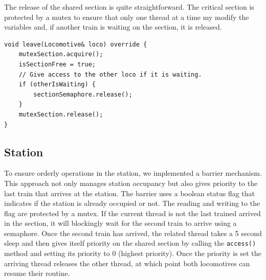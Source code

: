 \documentclass{article}
\begin{document}
    The release of the shared section is quite straightforward. The critical section is protected by a mutex to ensure that only one thread at a time my modify the variables and, if another train is waiting on the section, it is released.

    \begin{lstlisting}[caption={The shared section exit routine.}, captionpos=b, label=lst:2]
void leave(Locomotive& loco) override {
    mutexSection.acquire();
    isSectionFree = true;
    // Give access to the other loco if it is waiting.
    if (otherIsWaiting) {
        sectionSemaphore.release();
    }
    mutexSection.release();
}
    \end{lstlisting}

    \subsection{Station}

    To ensure orderly operations in the station, we implemented a barrier mechanism. This approach not only manages station occupancy but also gives priority to the last train that arrives at the station. The barrier uses a boolean status flag that indicates if the station is already occupied or not. The reading and writing to the flag are protected by a mutex. If the current thread is not the last trained arrived in the section, it will blockingly wait for the second train to arrive using a semaphore. Once the second train has arrived, the related thread takes a 5 second sleep and then gives itself priority on the shared section by calling the \texttt{access()} method and setting its priority to 0 (highest priority). Once the priority is set the arriving thread releases the other thread, at which point both locomotives can resume their routine.
\end{document}
